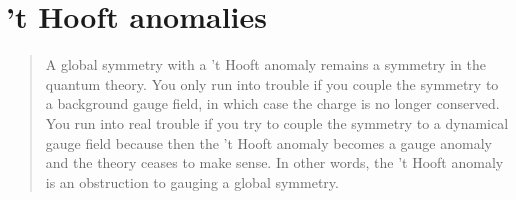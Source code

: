\documentclass[a4paper,11pt]{article}
\begin{document}
\section{'t Hooft anomalies}
\begin{quote}
    A global symmetry with a 't Hooft anomaly remains a symmetry in the quantum
 theory. You only run into trouble if you couple the symmetry to a background gauge field, in which
 case the charge is no longer conserved. You run into real trouble if you try to couple
 the symmetry to a dynamical gauge field because then the 't Hooft anomaly becomes
 a gauge anomaly and the theory ceases to make sense. In other words, the 't Hooft
 anomaly is an obstruction to gauging a global symmetry.
\end{quote}
\end{document}
